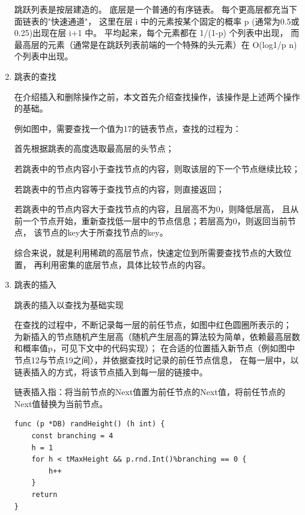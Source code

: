 \begin{enumerate}
		跳跃列表是按层建造的。
		底层是一个普通的有序链表。
		每个更高层都充当下面链表的"快速通道"，
		这里在层 i 中的元素按某个固定的概率 p (通常为0.5或0.25)出现在层 i+1 中。
		平均起来，每个元素都在 1/(1-p) 个列表中出现，
		而最高层的元素（通常是在跳跃列表前端的一个特殊的头元素）在 O(log1/p n) 个列表中出现。

		\item 跳表的查找
		
		
		在介绍插入和删除操作之前，本文首先介绍查找操作，该操作是上述两个操作的基础。

例如图中，需要查找一个值为17的链表节点，查找的过程为：

首先根据跳表的高度选取最高层的头节点；

若跳表中的节点内容小于查找节点的内容，则取该层的下一个节点继续比较；

若跳表中的节点内容等于查找节点的内容，则直接返回；

若跳表中的节点内容大于查找节点的内容，且层高不为0，则降低层高，
且从前一个节点开始，重新查找低一层中的节点信息；若层高为0，则返回当前节点，
该节点的key大于所查找节点的key。

综合来说，就是利用稀疏的高层节点，快速定位到所需要查找节点的大致位置，
再利用密集的底层节点，具体比较节点的内容。
		

		\item 跳表的插入
		
		跳表的插入以查找为基础实现


		在查找的过程中，不断记录每一层的前任节点，如图中红色圆圈所表示的；
		为新插入的节点随机产生层高（随机产生层高的算法较为简单，依赖最高层数和概率值p，可见下文中的代码实现）；
		在合适的位置插入新节点（例如图中节点12与节点19之间），并依据查找时记录的前任节点信息，
		在每一层中，以链表插入的方式，将该节点插入到每一层的链接中。


		链表插入指：将当前节点的Next值置为前任节点的Next值，将前任节点的Next值替换为当前节点。

		\begin{lstlisting}[caption=skiplistRandHeight , label=code_radds_storage_skiplist_randHeight]
func (p *DB) randHeight() (h int) {
	const branching = 4
	h = 1
	for h < tMaxHeight && p.rnd.Int()%branching == 0 {
		h++
	}
	return
}	
		\end{lstlisting}


\end{enumerate}

